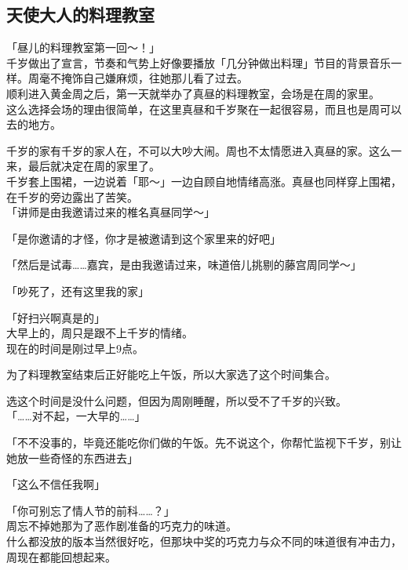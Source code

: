 \subsection{天使大人的料理教室}

「昼儿的料理教室第一回～！」\\

千岁做出了宣言，节奏和气势上好像要播放「几分钟做出料理」节目的背景音乐一样。周毫不掩饰自己嫌麻烦，往她那儿看了过去。\\

顺利进入黄金周之后，第一天就举办了真昼的料理教室，会场是在周的家里。\\

这么选择会场的理由很简单，在这里真昼和千岁聚在一起很容易，而且也是周可以去的地方。

千岁的家有千岁的家人在，不可以大吵大闹。周也不太情愿进入真昼的家。这么一来，最后就决定在周的家里了。\\

千岁套上围裙，一边说着「耶～」一边自顾自地情绪高涨。真昼也同样穿上围裙，在千岁的旁边露出了苦笑。\\

「讲师是由我邀请过来的椎名真昼同学～」

「是你邀请的才怪，你才是被邀请到这个家里来的好吧」

「然后是试毒……嘉宾，是由我邀请过来，味道倍儿挑剔的藤宫周同学～」

「吵死了，还有这里我的家」

「好扫兴啊真是的」\\

大早上的，周只是跟不上千岁的情绪。\\

现在的时间是刚过早上9点。

为了料理教室结束后正好能吃上午饭，所以大家选了这个时间集合。

选这个时间是没什么问题，但因为周刚睡醒，所以受不了千岁的兴致。\\

「……对不起，一大早的……」

「不不没事的，毕竟还能吃你们做的午饭。先不说这个，你帮忙监视下千岁，别让她放一些奇怪的东西进去」

「这么不信任我啊」

「你可别忘了情人节的前科……？」\\

周忘不掉她那为了恶作剧准备的巧克力的味道。\\

什么都没放的版本当然很好吃，但那块中奖的巧克力与众不同的味道很有冲击力，周现在都能回想起来。

